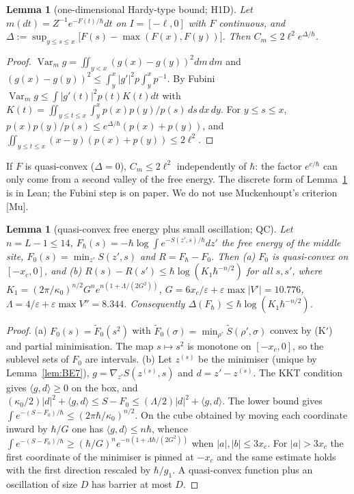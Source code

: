 \documentclass[11pt,a4paper]{article}
\newtheorem{lemma}[theorem]{Lemma}
\theoremstyle{definition}
\theoremstyle{remark}
\newcommand{\Var}{\operatorname{Var}}
\newcommand{\xc}{x_c}
\begin{document}
\begin{lemma}[one-dimensional Hardy-type bound; H1D]\label{lem:H1D}
Let $m(dt)=Z^{-1}e^{-F(t)/\hbar}dt$ on $I=[-\ell,0]$ with $F$ continuous, and $\Delta:=\sup_{y\le s\le x}\big[F(s)-\max(F(x),F(y))\big]$. Then $C_m\le2\ell^2e^{\Delta/\hbar}$.
\end{lemma}
\begin{proof}
$\Var_mg=\iint_{y<x}(g(x)-g(y))^2dm\,dm$ and $(g(x)-g(y))^2\le\int_y^x|g'|^2p\int_y^xp^{-1}$. By Fubini $\Var_mg\le\int|g'(t)|^2p(t)K(t)dt$ with $K(t)=\iint_{y\le t\le x}\int_y^xp(x)p(y)/p(s)\,ds\,dx\,dy$. For $y\le s\le x$, $p(x)p(y)/p(s)\le e^{\Delta/\hbar}(p(x)+p(y))$, and $\iint_{y\le t\le x}(x-y)(p(x)+p(y))\le2\ell^2$.
\end{proof}
If $F$ is quasi-convex ($\Delta=0$), $C_m\le2\ell^2$ independently of $\hbar$: the factor $e^{c/\hbar}$ can only come from a second valley of the free energy. The discrete form of Lemma~\ref{lem:H1D} is in Lean; the Fubini step is on paper. We do not use Muckenhoupt's criterion [Mu].

\begin{lemma}[quasi-convex free energy plus small oscillation; QC]\label{lem:QC}
Let $n=L-1\le14$, $F_\hbar(s)=-\hbar\log\int e^{-S(z',s)/\hbar}dz'$ the free energy of the middle site, $F_0(s)=\min_{z'}S(z',s)$ and $R=F_\hbar-F_0$. Then \textup{(a)} $F_0$ is quasi-convex on $[-\xc,0]$, and \textup{(b)} $R(s)-R(s')\le\hbar\log(K_1\hbar^{-n/2})$ for all $s,s'$, where $K_1=(2\pi/\kappa_0)^{n/2}G^ne^{n(1+\Lambda/(2G^2))}$, $G=6\xc/\varepsilon+\varepsilon\max|V'|=10.776$, $\Lambda=4/\varepsilon+\varepsilon\max V''=8.344$. Consequently $\Delta(F_\hbar)\le\hbar\log(K_1\hbar^{-n/2})$.
\end{lemma}
\begin{proof}
(a) $F_0(s)=\tilde F_0(s^2)$ with $\tilde F_0(\sigma)=\min_{\rho'}\tilde S(\rho',\sigma)$ convex by (K$'$) and partial minimisation. The map $s\mapsto s^2$ is monotone on $[-\xc,0]$, so the sublevel sets of $F_0$ are intervals.
(b) Let $z^{(s)}$ be the minimiser (unique by Lemma~\ref{lem:BE7}), $g=\nabla_{z'}S(z^{(s)},s)$ and $d=z'-z^{(s)}$. The KKT condition gives $\langle g,d\rangle\ge0$ on the box, and $(\kappa_0/2)|d|^2+\langle g,d\rangle\le S-F_0\le(\Lambda/2)|d|^2+\langle g,d\rangle$. The lower bound gives $\int e^{-(S-F_0)/\hbar}\le(2\pi\hbar/\kappa_0)^{n/2}$. On the cube obtained by moving each coordinate inward by $\hbar/G$ one has $\langle g,d\rangle\le n\hbar$, whence $\int e^{-(S-F_0)/\hbar}\ge(\hbar/G)^ne^{-n(1+\Lambda\hbar/(2G^2))}$ when $|a|,|b|\le3\xc$. For $|a|>3\xc$ the first coordinate of the minimiser is pinned at $-\xc$ and the same estimate holds with the first direction rescaled by $\hbar/g_1$. A quasi-convex function plus an oscillation of size $D$ has barrier at most $D$.
\end{proof}
\end{document}
